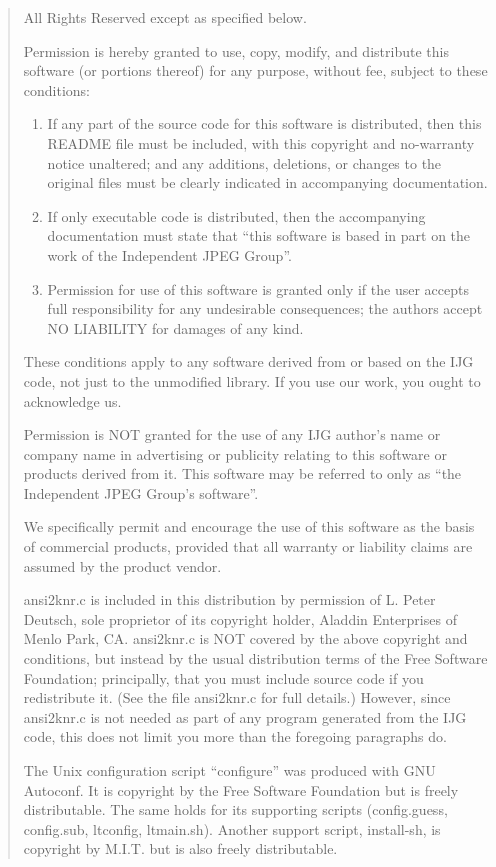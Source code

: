 \documentclass[
]{book}
\theoremstyle{definition}
\theoremstyle{definition}
\theoremstyle{definition}
\theoremstyle{definition}
\theoremstyle{remark}
\begin{document}
\begin{quote}
All Rights Reserved except as specified below.

Permission is hereby granted to use, copy, modify, and distribute this
software (or portions thereof) for any purpose, without fee, subject to these
conditions:

\begin{enumerate}
\def\labelenumi{(\arabic{enumi})}
\item
  If any part of the source code for this software is distributed, then this
  README file must be included, with this copyright and no-warranty notice
  unaltered; and any additions, deletions, or changes to the original files
  must be clearly indicated in accompanying documentation.
\item
  If only executable code is distributed, then the accompanying
  documentation must state that ``this software is based in part on the work of
  the Independent JPEG Group''.
\item
  Permission for use of this software is granted only if the user accepts
  full responsibility for any undesirable consequences; the authors accept
  NO LIABILITY for damages of any kind.
\end{enumerate}

These conditions apply to any software derived from or based on the IJG code,
not just to the unmodified library. If you use our work, you ought to
acknowledge us.

Permission is NOT granted for the use of any IJG author's name or company name
in advertising or publicity relating to this software or products derived from
it. This software may be referred to only as ``the Independent JPEG Group's
software''.

We specifically permit and encourage the use of this software as the basis of
commercial products, provided that all warranty or liability claims are
assumed by the product vendor.

ansi2knr.c is included in this distribution by permission of L. Peter Deutsch,
sole proprietor of its copyright holder, Aladdin Enterprises of Menlo Park, CA.
ansi2knr.c is NOT covered by the above copyright and conditions, but instead
by the usual distribution terms of the Free Software Foundation; principally,
that you must include source code if you redistribute it. (See the file
ansi2knr.c for full details.) However, since ansi2knr.c is not needed as part
of any program generated from the IJG code, this does not limit you more than
the foregoing paragraphs do.

The Unix configuration script ``configure'' was produced with GNU Autoconf.
It is copyright by the Free Software Foundation but is freely distributable.
The same holds for its supporting scripts (config.guess, config.sub,
ltconfig, ltmain.sh). Another support script, install-sh, is copyright
by M.I.T. but is also freely distributable.


\end{quote}
\end{document}
